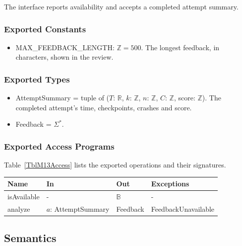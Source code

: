 \documentclass[12pt, titlepage]{article}
\begin{document}
The interface reports availability and accepts a completed attempt summary.

\subsubsection{Exported Constants}

\begin{itemize}
\item MAX\_FEEDBACK\_LENGTH: $\mathbb{Z} = 500$. The longest feedback, in
  characters, shown in the review.
\end{itemize}

\subsubsection{Exported Types}

\begin{itemize}
\item AttemptSummary = tuple of ($T$: $\mathbb{R}$, $k$: $\mathbb{Z}$, $n$:
  $\mathbb{Z}$, $C$: $\mathbb{Z}$, score: $\mathbb{Z}$). The completed
  attempt's time, checkpoints, crashes and score.
\item Feedback = $\Sigma^*$.
\end{itemize}

\subsubsection{Exported Access Programs}

Table~\ref{TblM13Access} lists the exported operations and their signatures.

\begin{center}
\begin{minipage}{\textwidth}
\begin{tabularx}{\textwidth}{p{2.6cm} p{3.6cm} p{2.4cm} X}
\toprule
\textbf{Name} & \textbf{In} & \textbf{Out} & \textbf{Exceptions} \\
\midrule
isAvailable & - & $\mathbb{B}$ & - \\
analyze & $a$: AttemptSummary & Feedback & FeedbackUnavailable \\
\bottomrule
\end{tabularx}
\label{TblM13Access}
\end{minipage}
\end{center}

\subsection{Semantics}
\end{document}
